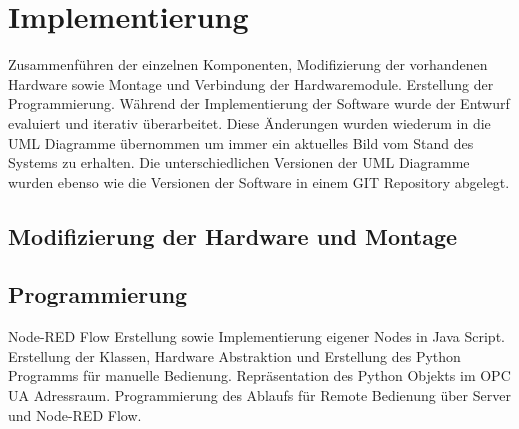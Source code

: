 \documentclass[BMR,Bachelor,ngerman]{twbook}%
\begin{document}
\section{Implementierung}
Zusammenführen der einzelnen Komponenten, Modifizierung der vorhandenen Hardware sowie Montage und Verbindung der Hardwaremodule. Erstellung der Programmierung. Während der Implementierung der Software wurde der Entwurf evaluiert und iterativ überarbeitet. Diese Änderungen wurden wiederum in die UML Diagramme übernommen um immer ein aktuelles Bild vom Stand des Systems zu erhalten. Die unterschiedlichen Versionen der UML Diagramme wurden ebenso wie die Versionen der Software in einem GIT Repository abgelegt.
%
\subsection{Modifizierung der Hardware und Montage}
%
\subsection{Programmierung}
Node-RED Flow Erstellung sowie Implementierung eigener Nodes in Java Script.
Erstellung der Klassen, Hardware Abstraktion und Erstellung des Python Programms für manuelle Bedienung. Repräsentation des Python Objekts im OPC UA Adressraum. Programmierung des Ablaufs für Remote Bedienung über Server und Node-RED Flow.
\end{document}
